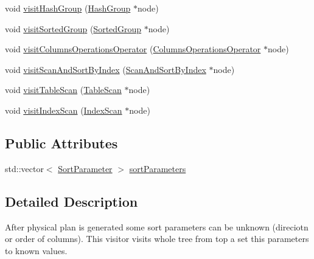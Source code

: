 \begin{DoxyCompactItemize}
void \hyperlink{class_sort_resolving_physical_operator_visitor_a825bb376e6a827d7b45495efcb16f83b}{visit\+Hash\+Group} (\hyperlink{class_hash_group}{Hash\+Group} $\ast$node)
\item 
void \hyperlink{class_sort_resolving_physical_operator_visitor_ae3d9a9443c6dc80abfdb9bee939f7718}{visit\+Sorted\+Group} (\hyperlink{class_sorted_group}{Sorted\+Group} $\ast$node)
\item 
void \hyperlink{class_sort_resolving_physical_operator_visitor_a22bf2c5442c65d923a166269ac45f5ab}{visit\+Columns\+Operations\+Operator} (\hyperlink{class_columns_operations_operator}{Columns\+Operations\+Operator} $\ast$node)
\item 
void \hyperlink{class_sort_resolving_physical_operator_visitor_aca7c9e51a6d7b86b05633877c4cb3bfb}{visit\+Scan\+And\+Sort\+By\+Index} (\hyperlink{class_scan_and_sort_by_index}{Scan\+And\+Sort\+By\+Index} $\ast$node)
\item 
void \hyperlink{class_sort_resolving_physical_operator_visitor_a39e47ce8a74242f9f2d4b5b98f7a4bb9}{visit\+Table\+Scan} (\hyperlink{class_table_scan}{Table\+Scan} $\ast$node)
\item 
void \hyperlink{class_sort_resolving_physical_operator_visitor_a2ea2205b6cdf14abf427d65e486116d8}{visit\+Index\+Scan} (\hyperlink{class_index_scan}{Index\+Scan} $\ast$node)
\end{DoxyCompactItemize}
\subsection*{Public Attributes}
\begin{DoxyCompactItemize}
\item 
std\+::vector$<$ \hyperlink{class_sort_parameter}{Sort\+Parameter} $>$ \hyperlink{class_sort_resolving_physical_operator_visitor_aa962193d5211541430e94f2a0961c641}{sort\+Parameters}
\end{DoxyCompactItemize}


\subsection{Detailed Description}
After physical plan is generated some sort parameters can be unknown (direciotn or order of columns). This visitor visits whole tree from top a set this parameters to known values. 

